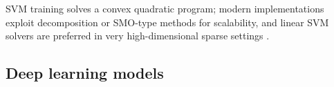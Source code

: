 SVM training solves a convex quadratic program; modern implementations exploit decomposition or SMO-type methods for scalability, and linear SVM solvers are preferred in very high-dimensional sparse settings \autocite{cortesSupportvectorNetworks1995b,scholkopfLearningKernelsSupport2001}.



\subsection{Deep learning models}

